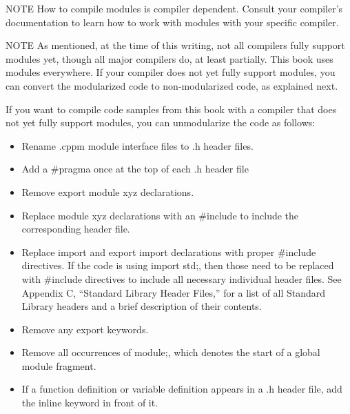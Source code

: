 \begin{myNotic}{NOTE}
How to compile modules is compiler dependent. Consult your compiler’s documentation to learn how to work with modules with your specific compiler.
\end{myNotic}


\begin{myNotic}{NOTE}
As mentioned, at the time of this writing, not all compilers fully support modules yet, though all major compilers do, at least partially. This book uses modules everywhere. If your compiler does not yet fully support modules, you can convert the modularized code to non-modularized code, as explained next.
\end{myNotic}


If you want to compile code samples from this book with a compiler that does not yet fully support modules, you can unmodularize the code as follows:

\begin{itemize}
\item
Rename .cppm module interface files to .h header files.

\item
Add a \#pragma once at the top of each .h header file

\item
Remove export module xyz declarations.

\item
Replace module xyz declarations with an \#include to include the corresponding header file.

\item
Replace import and export import declarations with proper \#include directives. If the code is using import std;, then those need to be replaced with \#include directives to include all necessary individual header files. See Appendix C, “Standard Library Header Files,” for a list of all Standard Library headers and a brief description of their contents.

\item
Remove any export keywords.

\item
Remove all occurrences of module;, which denotes the start of a global module fragment.

\item
If a function definition or variable definition appears in a .h header file, add the inline keyword in front of it.
\end{itemize}

